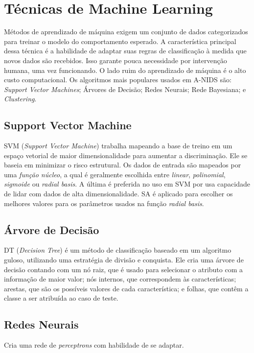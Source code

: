  \section{Técnicas de Machine Learning}
 Métodos de aprendizado de máquina exigem um conjunto de dados categorizados para treinar o modelo do comportamento
 esperado. A característica principal dessa técnica é a habilidade de adaptar suas regras de classificação à medida que
 novos dados são recebidos. Isso garante pouca necessidade por intervenção humana, uma vez funcionando. O lado ruim
 do aprendizado de máquina é o alto custo computacional. Os algoritmos mais populares usados em A-NIDS são:
\emph{Support Vector Machines}; Árvores de Decisão; Redes Neurais; Rede Bayesiana; e \emph{Clustering}.

    \subsection{Support Vector Machine}
    SVM (\emph{Support Vector Machine}) trabalha mapeando a base de treino em um espaço vetorial de maior dimensionalidade para aumentar a discriminação.
    Ele se baseia em minimizar o risco estrutural. Os dados de entrada são mapeados por uma \textit{função núcleo}, a qual
    é geralmente escolhida entre \textit{linear}, \textit{polinomial}, \textit{sigmoide} ou \textit{radial basis}. A última
    é preferida no uso em SVM por usa capacidade de lidar com dados de alta dimensionalidade. SA é aplicado para escolher
    os melhores valores para os parâmetros usados na função \textit{radial basis}.

    \subsection{Árvore de Decisão}
    DT (\emph{Decision Tree}) é um método de classificação baseado em um algoritmo guloso, utilizando uma estratégia de divisão e conquista. Ele
    cria uma árvore de decisão contando com um nó raiz, que é usado para selecionar o atributo com a informação de maior valor;
    nós internos, que correspondem às características; arestas, que são os possíveis valores de cada característica; e
    folhas, que contêm a classe a ser atribuída ao caso de teste.

    \subsection{Redes Neurais}
        Cria uma rede de \emph{perceptrons} com habilidade de se adaptar.

